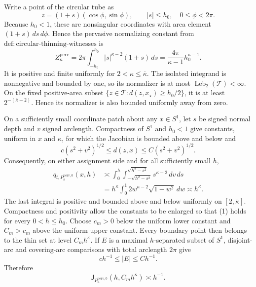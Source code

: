 Write a point of the circular tube as
\[
 z=(1+s)(\cos\phi,\sin\phi),\qquad |s|\le h_0,\quad 0\le\phi<2\pi.
\]
Because \(h_0<1\), these are nonsingular coordinates with area element \((1+s)\,ds\,d\phi\). Hence the pervasive normalizing constant from \(\mathrm{def:circular\text{-}thinning\text{-}witnesses}\) is
\[
 Z_{\kappa}^{\mathrm{perv}}
 =2\pi\int_{-h_0}^{h_0}|s|^{\kappa-2}(1+s)\,ds
 =\frac{4\pi}{\kappa-1}h_0^{\kappa-1}.
\]
It is positive and finite uniformly for \(2<\kappa\le\overline\kappa\). The isolated integrand is nonnegative and bounded by one, so its normalizer is at most \(\operatorname{Leb}_2(\mathcal T)<\infty\). On the fixed positive-area subset \(\{z\in\mathcal T:d(z,x_{\star})\ge h_0/2\}\), it is at least \(2^{-(\overline\kappa-2)}\). Hence its normalizer is also bounded uniformly away from zero.

On a sufficiently small coordinate patch about any \(x\in S^1\), let \(s\) be signed normal depth and \(v\) signed arclength. Compactness of \(S^1\) and \(h_0<1\) give constants, uniform in \(x\) and \(\kappa\), for which the Jacobian is bounded above and below and
\[
 c(s^2+v^2)^{1/2}\le d(z,x)\le C(s^2+v^2)^{1/2}.
\]
Consequently, on either assignment side and for all sufficiently small \(h\),
\[
 \begin{aligned}
 q_{t,P_{\kappa}^{\mathrm{perv},0}}(x,h)
 &\asymp \int_0^h\int_{-\sqrt{h^2-s^2}}^{\sqrt{h^2-s^2}}
 s^{\kappa-2}\,dv\,ds\\
 &=h^{\kappa}\int_0^1 2w^{\kappa-2}\sqrt{1-w^2}\,dw
 \asymp h^{\kappa}.
 \end{aligned} \tag{1}
\]
The last integral is positive and bounded above and below uniformly on \([2,\overline\kappa]\). Compactness and positivity allow the constants to be enlarged so that (1) holds for every \(0<h\le h_0\). Choose \(c_m>0\) below the uniform lower constant and \(C_m>c_m\) above the uniform upper constant. Every boundary point then belongs to the thin set at level \(C_mh^{\kappa}\). If \(E\) is a maximal \(h\)-separated subset of \(S^1\), disjoint-arc and covering-arc comparisons with total arclength \(2\pi\) give
\[
 c h^{-1}\le |E|\le C h^{-1}.
\]
Therefore
\[
 \mathsf J_{P_{\kappa}^{\mathrm{perv},0}}(h,C_mh^{\kappa})\asymp h^{-1}. \tag{2}
\]


